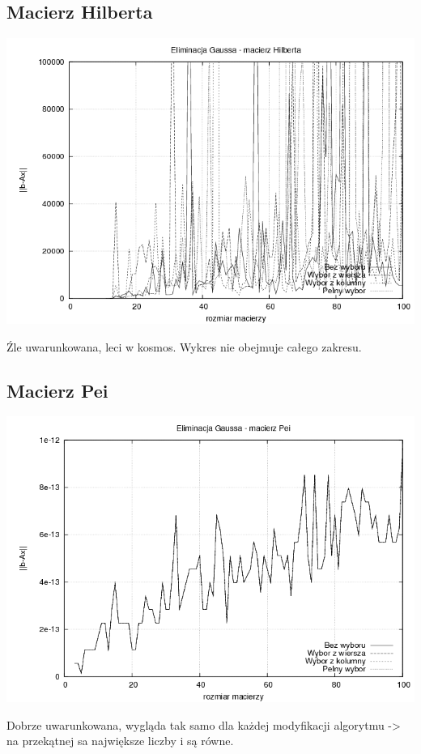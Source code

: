 \documentclass[a4paper,10pt]{article}
\begin{document}
    \subsection{Macierz Hilberta}
        \begin{center}
            \includegraphics[width=140mm]{hilbert_plot.png}
        \end{center}
        Źle uwarunkowana, leci w kosmos. Wykres nie obejmuje całego zakresu.
    \subsection{Macierz Pei}
        \begin{center}
            \includegraphics[width=140mm]{pei_plot.png}
        \end{center}
        Dobrze uwarunkowana, wygląda tak samo dla każdej modyfikacji algorytmu -> na przekątnej sa największe liczby i są równe.
\end{document}
